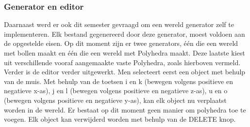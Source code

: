 \subsubsection{Generator en editor}
Daarnaast werd er ook dit semester gevraagd om een wereld generator zelf te implementeren. Elk bestand gegenereerd door deze generator, moest voldoen aan de opgestelde eisen. Op dit moment zijn er twee generators, één die een wereld met bollen maakt en één die een wereld met Polyhedra maakt. Deze laatste kiest uit verschillende vooraf aangemaakte vaste Polyhedra, zoals hierboven vermeld.
\\

\noindent
Verder is de editor verder uitgewerkt. Men selecteert eerst een object met behulp van de muis. Met behulp van de toetsen i en k (bewegen volgens positieve en negatieve x-as), j en l (bewegen volgens positieve en negatieve z-as), u en o (bewegen volgens positieve en negatieve y-as), kan elk object nu verplaatst worden in de wereld. Er bestaat op dit moment geen manier om polyhedra toe te voegen. Elk object kan verwijderd worden met behulp van de DELETE knop.